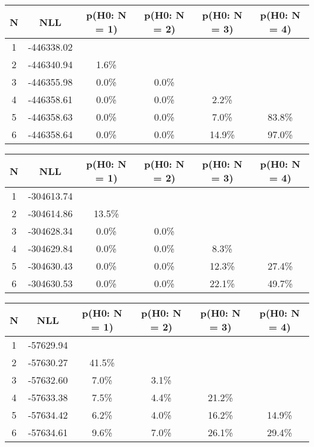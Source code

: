 \begin{table}[htb]
	\begin{center}
{\footnotesize\renewcommand{\arraystretch}{1.4}
		\begin{tabular}{cc||cccc}
			N & NLL & p(H0: N = 1) & p(H0: N = 2) & p(H0: N = 3) & p(H0: N = 4)\\ 
		\hline
1 & -446338.02 & & & & \\
2 & -446340.94 & 1.6\% & & & \\
3 & -446355.98 & 0.0\% & 0.0\% & & \\
4 & -446358.61 & 0.0\% & 0.0\% & 2.2\% & \\
5 & -446358.63 & 0.0\% & 0.0\% & 7.0\% & 83.8\% \\
6 & -446358.64 & 0.0\% & 0.0\% & 14.9\% & 97.0\% \\
	\end{tabular}
		\label{tab:lab}
	}
	\end{center}\end{table}

\begin{table}[htb]
	\begin{center}
{\footnotesize\renewcommand{\arraystretch}{1.4}
		\begin{tabular}{cc||cccc}
			N & NLL & p(H0: N = 1) & p(H0: N = 2) & p(H0: N = 3) & p(H0: N = 4)\\ 
		\hline
1 & -304613.74 & & & & \\
2 & -304614.86 & 13.5\% & & & \\
3 & -304628.34 & 0.0\% & 0.0\% & & \\
4 & -304629.84 & 0.0\% & 0.0\% & 8.3\% & \\
5 & -304630.43 & 0.0\% & 0.0\% & 12.3\% & 27.4\% \\
6 & -304630.53 & 0.0\% & 0.0\% & 22.1\% & 49.7\% \\
	\end{tabular}
		\label{tab:lab}
	}
	\end{center}\end{table}

\begin{table}[htb]
	\begin{center}
{\footnotesize\renewcommand{\arraystretch}{1.4}
		\begin{tabular}{cc||cccc}
			N & NLL & p(H0: N = 1) & p(H0: N = 2) & p(H0: N = 3) & p(H0: N = 4)\\ 
		\hline
1 & -57629.94 & & & & \\
2 & -57630.27 & 41.5\% & & & \\
3 & -57632.60 & 7.0\% & 3.1\% & & \\
4 & -57633.38 & 7.5\% & 4.4\% & 21.2\% & \\
5 & -57634.42 & 6.2\% & 4.0\% & 16.2\% & 14.9\% \\
6 & -57634.61 & 9.6\% & 7.0\% & 26.1\% & 29.4\% \\
	\end{tabular}
		\label{tab:lab}
	}
	\end{center}\end{table}

